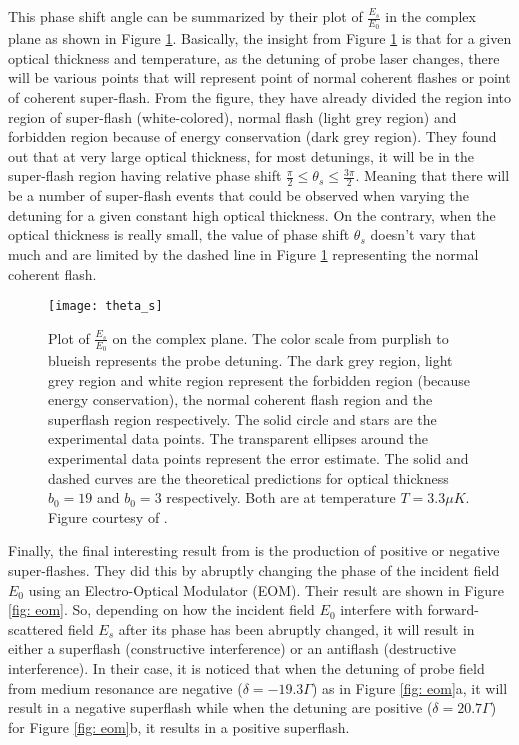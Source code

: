 This phase shift angle can be summarized by their plot of $\frac{E_{s}}{E_{0}}$ in the complex plane as shown in Figure \ref{fig: theta_s}. Basically, the insight from Figure \ref{fig: theta_s} is that for a given optical thickness and temperature, as the detuning of probe laser changes, there will be various points that will represent point of normal coherent flashes or point of coherent super-flash. From the figure, they have already divided the region into region of super-flash (white-colored), normal flash (light grey region) and forbidden region because of energy conservation (dark grey region). They found out that at very large optical thickness, for most detunings, it will be in the super-flash region having relative phase shift $\frac{\pi}{2} \leq \theta_{s} \leq \frac{3\pi}{2}$. Meaning that there will be a number of super-flash events that could be observed when varying the detuning for a given constant high optical thickness. On the contrary, when the optical thickness is really small, the value of phase shift $\theta_{s}$ doesn't vary that much and are limited by the dashed line in Figure \ref{fig: theta_s} representing the normal coherent flash.

\begin{figure}[h!]
    \centering
    \texttt{[image: theta\_s]}
    \caption{Plot of $\frac{E_{s}}{E_{0}}$ on the complex plane. The color scale from purplish to blueish represents the probe detuning. The dark grey region, light grey region and white region represent the forbidden region (because energy conservation), the normal coherent flash region and the superflash region respectively. The solid circle and stars are the experimental data points. The transparent ellipses around the experimental data points represent the error estimate. The solid and dashed curves are the theoretical predictions for optical thickness $b_{0} = 19$ and $b_{0} = 3$ respectively. Both are at temperature $T = 3.3\mu K$. Figure courtesy of \cite{Kwong2014}.}
    \label{fig: theta_s}
\end{figure}

Finally,  the final interesting result from \cite{Kwong2014} is the production of positive or negative super-flashes. They did this by abruptly changing the phase of the incident field $E_{0}$ using an Electro-Optical Modulator (EOM). Their result are shown in Figure \ref{fig: eom}. So, depending on how the incident field $E_{0}$ interfere with forward-scattered field $E_{s}$ after its phase has been abruptly changed, it will result in either a superflash (constructive interference) or an antiflash (destructive interference). In their case, it is noticed that when the detuning of probe field from medium resonance are negative ($\delta = -19.3 \Gamma$) as in Figure \ref{fig: eom}a, it will result in a negative superflash while when the detuning are positive ($\delta = 20.7 \Gamma$) for Figure \ref{fig: eom}b, it results in a positive superflash.

